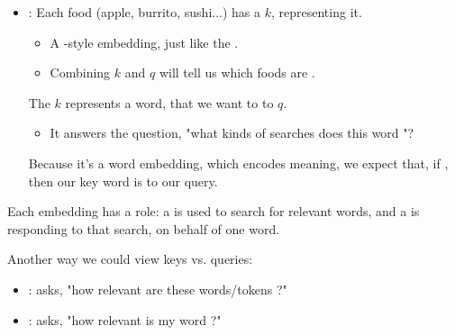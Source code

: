 \begin{itemize}
            \phantom{}

            \item {}: Each food (apple, burrito, sushi...) has a  $k$, representing it. 
            
            \begin{itemize}
                \item A -style embedding, just like the .

                \item Combining $k$ and $q$ will tell us which foods are .\\

            \end{itemize}

            \begin{definition}
                The  $k$ represents a word, that we want to  to  $q$.

                \begin{itemize}
                    \item It answers the question, "what kinds of searches does this word "?
                \end{itemize}

                Because it's a word embedding, which encodes meaning, we expect that, if , then our key word is  to our query.
            \end{definition}
        \end{itemize}

        Each embedding has a role: a  is used to search for relevant words, and a  is responding to that search, on behalf of one word.

        \begin{concept}
            Another way we could view keys vs. queries:

            \begin{itemize}
                \item {}: asks, "how relevant are these words/tokens ?"

                \item {}: asks, "how relevant is my word ?"
            \end{itemize}
        \end{concept}


